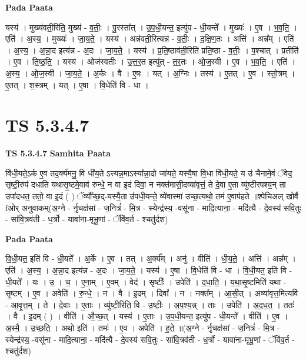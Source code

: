 \documentclass[17pt]{extarticle}
\begin{document}
\textbf{Pada Paata} \newline

यस्य॑ । मुख्य॑वती॒रिति॒ मुख्य॑ - व॒तीः॒ । पु॒रस्ता᳚त् । उ॒प॒धी॒यन्त॒ इत्यु॑प - धी॒यन्ते᳚ । मुख्यः॑ । ए॒व । भ॒व॒ति॒ । एति॑ । अ॒स्य॒ । मुख्यः॑ । जा॒य॒ते॒ । यस्य॑ । अन्न॑वती॒रित्यन्न॑ - व॒तीः॒ । द॒क्षि॒ण॒तः । अत्ति॑ । अन्न᳚म् । एति॑ । अ॒स्य॒ । अ॒न्ना॒द इत्य॑न्न - अ॒दः । जा॒य॒ते॒ । यस्य॑ । प्र॒ति॒ष्ठाव॑ती॒रिति॑ प्रति॒ष्ठा - व॒तीः॒ । प॒श्चात् । प्रतीति॑ । ए॒व । ति॒ष्ठ॒ति॒ । यस्य॑ । ओज॑स्वतीः । उ॒त्त॒र॒त इत्यु॑त् - त॒र॒तः । ओ॒ज॒स्वी । ए॒व । भ॒व॒ति॒ । एति॑ । अ॒स्य॒ । ओ॒ज॒स्वी । जा॒य॒ते॒ । अ॒र्कः । वै । ए॒षः । यत् । अ॒ग्निः । तस्य॑ । ए॒तत् । ए॒व । स्तो॒त्रम् । ए॒तत् । श॒स्त्रम् । यत् । ए॒षा । वि॒धेति॑ वि - धा ।  \newline




\section*{ TS 5.3.4.7 }

\textbf{TS 5.3.4.7 } \newline
\textbf{Samhita Paata} \newline

वि॑धी॒यते॒ऽर्क ए॒व तद॒र्क्य॑मनु॒ वि धी॑य॒ते ऽत्त्यन्न॒माऽस्या᳚न्ना॒दो जा॑यते॒ यस्यै॒षा वि॒धा वि॑धी॒यते॒ य उ॑ चैनामे॒वं ॅवेद॒ सृष्टी॒रुप॑ दधाति यथासृ॒ष्टमे॒वाव॑ रुन्धे॒ न वा इ॒दं दिवा॒ न नक्त॑मासी॒दव्या॑वृत्तं॒ ते दे॒वा ए॒ता व्यु॑ष्टीरपश्य॒न् ता उपा॑दधत॒ ततो॒ वा इ॒दं ( ) ॅव्यौ᳚च्छ॒द्-यस्यै॒ता उ॑पधी॒यन्ते॒ व्ये॑वास्मा॑ उच्छ॒त्यथो॒ तम॑ ए॒वाप॑हते ॥श्पेचिअल् खोर्वै fओर् अनुवाकम्(अ॒ग्ने - र्नृ॒चक्ष॑सां - ज॒नित्रं॑ - मि॒त्र - स्येन्द्र॑स्य॒ -वसू॑ना - मादि॒त्याना॒ - मदि॑त्यै - दे॒वस्य॑ सवि॒तुः - सा॑वि॒त्रव॑ती - ध॒र्त्रो - यावा॑ना-मृभू॒णां - ॅवि॑व॒र्त - श्चतु॑र्दश) \newline

\textbf{Pada Paata} \newline

वि॒धी॒यत॒ इति॑ वि - धी॒यते᳚ । अ॒र्के । ए॒व । तत् । अ॒र्क्य᳚म् । अनु॑ । वीति॑ । धी॒य॒ते॒ । अत्ति॑ । अन्न᳚म् । एति॑ । अ॒स्य॒ । अ॒न्ना॒द इत्य॑न्न - अ॒दः । जा॒य॒ते॒ । यस्य॑ । ए॒षा । वि॒धेति॑ वि - धा । वि॒धी॒यत॒ इति॑ वि - धी॒यते᳚ । यः । उ॒ । च॒ । ए॒ना॒म् । ए॒वम् । वेद॑ । सृष्टीः᳚ । उपेति॑ । द॒धा॒ति॒ । य॒था॒सृ॒ष्टमिति॑ यथा - सृ॒ष्टम् । ए॒व । अवेति॑ । रु॒न्धे॒ । न । वै । इ॒दम् । दिवा᳚ । न । नक्त᳚म् । आ॒सी॒त् । अव्या॑वृत्त॒मित्यवि॑ - आ॒वृ॒त्त॒म् । ते । दे॒वाः । ए॒ताः । व्यु॑ष्टी॒रिति॒ वि - उ॒ष्टीः॒ । अ॒प॒श्य॒न्न् । ताः । उपेति॑ । अ॒द॒ध॒त॒ । ततः॑ । वै । इ॒दम् ( ) । वीति॑ । औ॒च्छ॒त् । यस्य॑ । ए॒ताः । उ॒प॒धी॒यन्त॒ इत्यु॑प - धी॒यन्ते᳚ । वीति॑ । ए॒व । अ॒स्मै॒ । उ॒च्छ॒ति॒ । अथो॒ इति॑ । तमः॑ । ए॒व । अपेति॑ । ह॒ते॒ ॥(अ॒ग्ने - र्नृ॒चक्ष॑सां - ज॒नित्रं॑ - मि॒त्र - स्येन्द्र॑स्य॒ -वसू॑ना - मादि॒त्याना॒ - मदि॑त्यै - दे॒वस्य॑ सवि॒तुः - सा॑वि॒त्रव॑ती - ध॒र्त्रो - यावा॑ना-मृभू॒णां - ॅवि॑व॒र्त - श्चतु॑र्दश)  \newline
\end{document}
